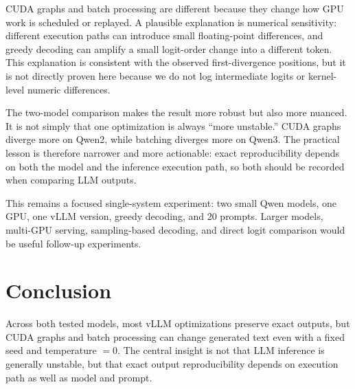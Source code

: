 \documentclass[11pt, letterpaper]{article}
\begin{document}
CUDA graphs and batch processing are different because they change how GPU work
is scheduled or replayed.  A plausible explanation is numerical sensitivity:
different execution paths can introduce small floating-point differences, and
greedy decoding can amplify a small logit-order change into a different token.
This explanation is consistent with the observed first-divergence positions, but
it is not directly proven here because we do not log intermediate logits or
kernel-level numeric differences.

The two-model comparison makes the result more robust but also more nuanced.  It
is not simply that one optimization is always ``more unstable.''  CUDA graphs
diverge more on Qwen2, while batching diverges more on Qwen3.  The practical
lesson is therefore narrower and more actionable: exact reproducibility depends
on both the model and the inference execution path, so both should be recorded
when comparing LLM outputs.

This remains a focused single-system experiment: two small Qwen models, one GPU,
one vLLM version, greedy decoding, and 20 prompts. Larger models,
multi-GPU serving, sampling-based decoding, and direct logit comparison would be
useful follow-up experiments.

\section{Conclusion}

Across both tested models, most vLLM optimizations preserve exact outputs, but
CUDA graphs and batch processing can change generated text even with a fixed
seed and temperature $=0$.  The central insight is not that LLM inference is
generally unstable, but that exact output reproducibility depends on execution
path as well as model and prompt.
\end{document}
